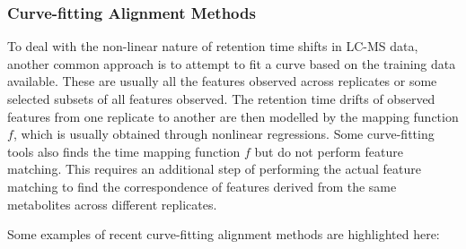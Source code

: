 \subsubsection{Curve-fitting Alignment Methods}

To deal with the non-linear nature of retention time shifts in LC-MS data, another common approach is to attempt to fit a curve based on the training data available. These are usually all the features observed across replicates or some selected subsets of all features observed. The retention time drifts of observed features from one replicate to another are then modelled by the mapping function $f$, which is usually obtained through nonlinear regressions. Some curve-fitting tools also finds the time mapping function $f$ but do not perform feature matching. This requires an additional step of performing the actual feature matching to find the correspondence of features derived from the same metabolites across different replicates.

Some examples of recent curve-fitting alignment methods are highlighted
here:

